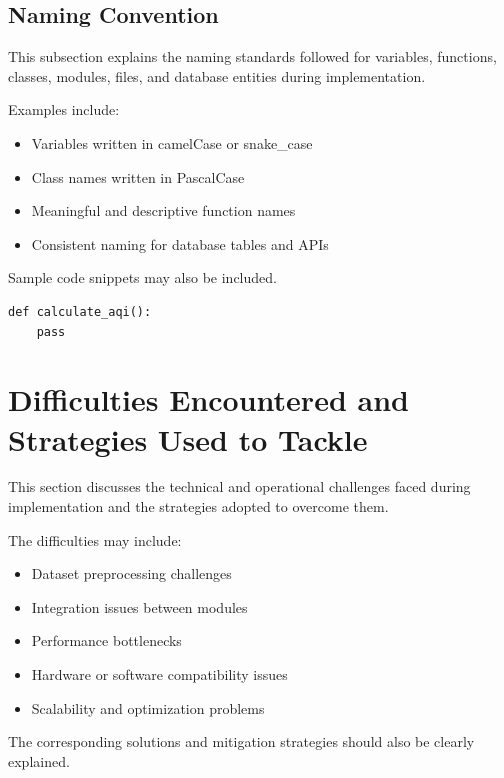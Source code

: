 \subsection{Naming Convention}

This subsection explains the naming standards followed for variables, functions, classes, modules, files, and database entities during implementation.

Examples include:
\begin{itemize}
    \item Variables written in camelCase or snake\_case
    \item Class names written in PascalCase
    \item Meaningful and descriptive function names
    \item Consistent naming for database tables and APIs
\end{itemize}

Sample code snippets may also be included.

\begin{verbatim}
def calculate_aqi():
    pass
\end{verbatim}


\section{Difficulties Encountered and Strategies Used to Tackle}

This section discusses the technical and operational challenges faced during implementation and the strategies adopted to overcome them.

The difficulties may include:
\begin{itemize}
    \item Dataset preprocessing challenges
    \item Integration issues between modules
    \item Performance bottlenecks
    \item Hardware or software compatibility issues
    \item Scalability and optimization problems
\end{itemize}

The corresponding solutions and mitigation strategies should also be clearly explained.


